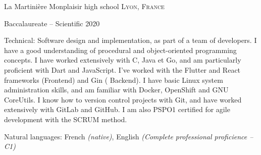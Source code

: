 \documentclass[10pt,a4paper]{article} %
\begin{document}
\headedsection %
{La Martinière Monplaisir high school}
{\textsc{Lyon, France}} {

    \headedsubsection %
    {Baccalaureate -- Scientific}
    {2020} {}
}

\spacedhrule{0.5em}{-0.4em} %



\inlineheadsection %
{Technical:}
{Software design and implementation,
    as part of a team of developers. I have a good understanding of
    procedural and object-oriented programming
    concepts. I have worked extensively with C, Java et Go,
    and am particularly proficient with Dart and JavaScript. I've worked with the Flutter and React frameworks (Frontend) and Gin (
    Backend). I have basic Linux system administration skills, and am familiar with Docker,
    OpenShift and GNU CoreUtils. I know how to version control projects with Git,
    and have worked extensively with GitLab and GitHub. I am also PSPO1 certified for agile development with the SCRUM method.}



\inlineheadsection %
{Natural languages:}
{French \textit{(native)}, English \textit{(Complete professional proficience -- C1)}}

\end{document}
